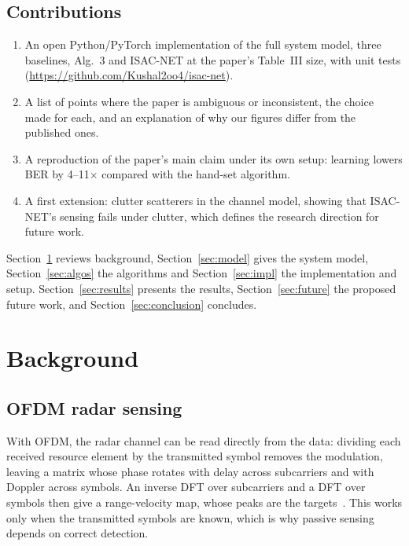 \documentclass[11pt,a4paper]{article}
\begin{document}
\subsection{Contributions}
\begin{enumerate}
  \item An open Python/PyTorch implementation of the full system model, three baselines, Alg.~3 and ISAC-NET at the paper's Table~III size, with unit tests (\url{https://github.com/Kushal2oo4/isac-net}).
  \item A list of points where the paper is ambiguous or inconsistent, the choice made for each, and an explanation of why our figures differ from the published ones.
  \item A reproduction of the paper's main claim under its own setup: learning lowers BER by 4--11$\times$ compared with the hand-set algorithm.
  \item A first extension: clutter scatterers in the channel model, showing that ISAC-NET's sensing fails under clutter, which defines the research direction for future work.
\end{enumerate}

Section~\ref{sec:background} reviews background, Section~\ref{sec:model} gives the system model, Section~\ref{sec:algos} the algorithms and Section~\ref{sec:impl} the implementation and setup. Section~\ref{sec:results} presents the results, Section~\ref{sec:future} the proposed future work, and Section~\ref{sec:conclusion} concludes.

\section{Background}\label{sec:background}
\subsection{OFDM radar sensing}
With OFDM, the radar channel can be read directly from the data: dividing each received resource element by the transmitted symbol removes the modulation, leaving a matrix whose phase rotates with delay across subcarriers and with Doppler across symbols. An inverse DFT over subcarriers and a DFT over symbols then give a range-velocity map, whose peaks are the targets~\cite{sturm2011}. This works only when the transmitted symbols are known, which is why passive sensing depends on correct detection.
\end{document}
